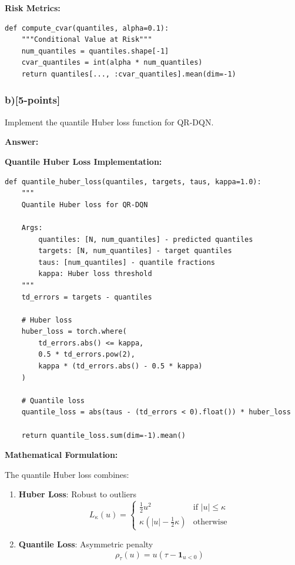 \documentclass[12pt]{article}
\begin{document}
{{\textbf{Risk Metrics:}
\begin{verbatim}
def compute_cvar(quantiles, alpha=0.1):
    """Conditional Value at Risk"""
    num_quantiles = quantiles.shape[-1]
    cvar_quantiles = int(alpha * num_quantiles)
    return quantiles[..., :cvar_quantiles].mean(dim=-1)
\end{verbatim}

\subsubsection{b)[5-points]} Implement the quantile Huber loss function for QR-DQN.

\textbf{Answer:}

\textbf{Quantile Huber Loss Implementation:}

\begin{verbatim}
def quantile_huber_loss(quantiles, targets, taus, kappa=1.0):
    """
    Quantile Huber loss for QR-DQN
    
    Args:
        quantiles: [N, num_quantiles] - predicted quantiles
        targets: [N, num_quantiles] - target quantiles
        taus: [num_quantiles] - quantile fractions
        kappa: Huber loss threshold
    """
    td_errors = targets - quantiles
    
    # Huber loss
    huber_loss = torch.where(
        td_errors.abs() <= kappa,
        0.5 * td_errors.pow(2),
        kappa * (td_errors.abs() - 0.5 * kappa)
    )
    
    # Quantile loss
    quantile_loss = abs(taus - (td_errors < 0).float()) * huber_loss
    
    return quantile_loss.sum(dim=-1).mean()
\end{verbatim}

\textbf{Mathematical Formulation:}

The quantile Huber loss combines:
\begin{enumerate}
\item \textbf{Huber Loss}: Robust to outliers
\begin{equation}
L_\kappa(u) = \begin{cases}
\frac{1}{2}u^2 & \text{if } |u| \leq \kappa \\
\kappa(|u| - \frac{1}{2}\kappa) & \text{otherwise}
\end{cases}
\end{equation}

\item \textbf{Quantile Loss}: Asymmetric penalty
\begin{equation}
\rho_\tau(u) = u(\tau - \mathbf{1}_{u < 0})
\end{equation}


\end{enumerate}}}
\end{document}

